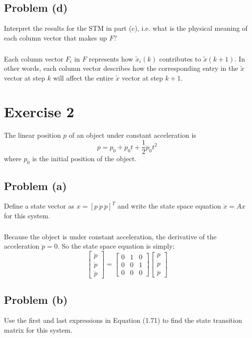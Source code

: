 \documentclass[11pt]{article}
\begin{document}
\subsection*{Problem (d)}
Interpret the results for the STM in part (c), i.e. what is the physical meaning of each column vector that makes up $F$?

\subparagraph{}
Each column vector $F_i$ in $F$ represents how $\tilde{x}_i(k)$ contributes to $\tilde{x}(k+1)$. In other words, each column vector describes how the corresponding entry in the $\tilde{x}$ vector at step $k$ will affect the entire $\tilde{x}$ vector at step $k+1$.

\section*{Exercise 2}
The linear position $p$ of an object under constant acceleration is
\begin{equation*}
	p = p_0 + \dot{p}_0t + \frac{1}{2}\ddot{p}_0t^2
\end{equation*}
where $p_0$ is the initial position of the object.

\subsection*{Problem (a)}
Define a state vector as $x=[p\ \dot{p}\ \ddot{p}]^T$ and write the state space equation $\dot{x} = Ax$ for this system.

\subparagraph*{}
Because the object is under constant acceleration, the derivative of the acceleration $\dddot{p} = 0$. So the state space equation is simply:
\begin{equation*}
	\begin{bmatrix} \dot{p} \\ \ddot{p} \\ \dddot{p} \end{bmatrix} = \begin{bmatrix} 0 & 1 & 0 \\ 0 & 0 & 1 \\ 0 & 0 & 0 \end{bmatrix} \begin{bmatrix} p \\ \dot{p} \\ \ddot{p} \end{bmatrix}
\end{equation*}

\subsection*{Problem (b)}
Use the first and last expressions in Equation (1.71) to find the state transition matrix for this system.
\end{document}
